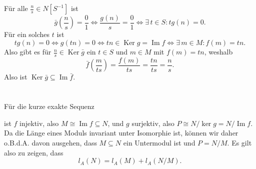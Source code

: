 \documentclass[a4paper,10pt]{article}
\theoremstyle{definition}
\newcommand{\Img}{\operatorname{Im}}
\newcommand{\Ker}{\operatorname{Ker}}
\begin{document}
Für alle $\frac{n}{s} \in N[S^{-1}]$ ist
\[
 \bar{g}\left(\frac{n}{s}\right) = \frac{0}{1}
 \Leftrightarrow \frac{g(n)}{s} = \frac{0}{1}
 \Leftrightarrow \exists\, t \in S : tg(n) = 0.
\]
Für ein solches $t$ ist
\[
 tg(n) = 0 
 \Leftrightarrow g(tn) = 0
 \Leftrightarrow tn \in \Ker g = \Img f
 \Leftrightarrow \exists\, m \in M : f(m) = tn.
\]
Also gibt es für $\frac{n}{s} \in \Ker \bar{g}$ ein $t \in S$ und $m \in M$ mit $f(m) = tn$, weshalb
\[
 \bar{f}\left( \frac{m}{ts} \right)
 = \frac{f(m)}{ts}
 = \frac{tn}{ts}
 = \frac{n}{s}.
\]
Also ist $\Ker \bar{g} \subseteq \Img \bar{f}$.


























      



















\section{}
Für die kurze exakte Sequenz
\begin{center}
\end{center}
ist $f$ injektiv, also $M \cong \Img f \subseteq N$, und $g$ surjektiv, also $P \cong N / \ker g = N / \Img f$. Da die Länge eines Moduls invariant unter Isomorphie ist, können wir daher o.B.d.A. davon ausgehen, dass $M \subseteq N$ ein Untermodul ist und $P = N/M$. Es gilt also zu zeigen, dass
\[
 l_A(N) = l_A(M) + l_A(N/M).
\]
\end{document}
